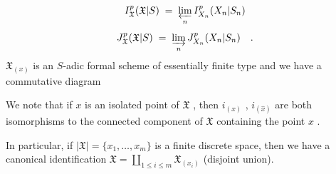 \begin{equation*}
 I^p_{\mathfrak{X}}(\mathfrak{X}|S) \;=\; \varprojlim_{n} I^p_{X_n}(X_n|S_n)
\end{equation*}
\begin{equation*}
J^p_{\mathfrak{X}}(\mathfrak{X}|S) \;=\; \varinjlim_{n} J^p_{X_n}(X_n|S_n) \quad .
\end{equation*}
$\mathfrak{X}_{(x)}$ is an $S$-adic formal scheme of essentially finite type and we have a commutative diagram

\begin{center}
\end{center}
We note that if $x$ is an isolated point of $\mathfrak{X}$ , then $i_{(x)}$ , $i_{(\widehat{x})}$ are both isomorphisms to the connected component of $\mathfrak{X}$ containing the point $x$ .

In particular, if $|\mathfrak{X}| = \{x_1,\dots,x_m\}$ is a finite discrete space, then we have a canonical identification $\mathfrak{X} = \coprod_{1 \leq i \leq m} \mathfrak{X}_{(x_i)}$ (disjoint union).

